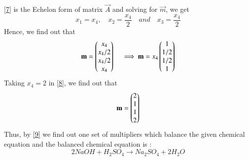 \documentclass[journal,12pt,twocolumn]{IEEEtran}
\begin{document}
 \ref{7} is the Echelon form of matrix $\vec{A}$ and solving for $\vec{m}$, we get
 \begin{equation}
 	x_1 = x_4,\quad x_2 = \frac{x_4}{2} \quad and \quad x_3 = \frac{x_4}{2} 
 \end{equation} 
Hence, we find out that
\begin{equation}\label{8}
	\mathbf{m} = \begin{pmatrix}x_4 \\ x_4/2 \\ x_4/2 \\ x_4\end{pmatrix} \quad \implies \mathbf{m} = x_4 \begin{pmatrix}1 \\ 1/2 \\ 1/2 \\1\end{pmatrix}
\end{equation}
Taking $x_4 =2$ in \ref{8}, we find out that
\begin{equation}\label{9}
	\mathbf{m} = \begin{pmatrix}2 \\ 1\\ 1\\ 2\end{pmatrix}
\end{equation}
Thus, by \ref{9} we find out one set of multipliers which balance the given chemical equation and the balanced chemical equation is :
\begin{equation*}
2NaOH + H_2SO_4 \xrightarrow{} Na_2SO_4  +  2H_2O	
\end{equation*}
\end{document}
